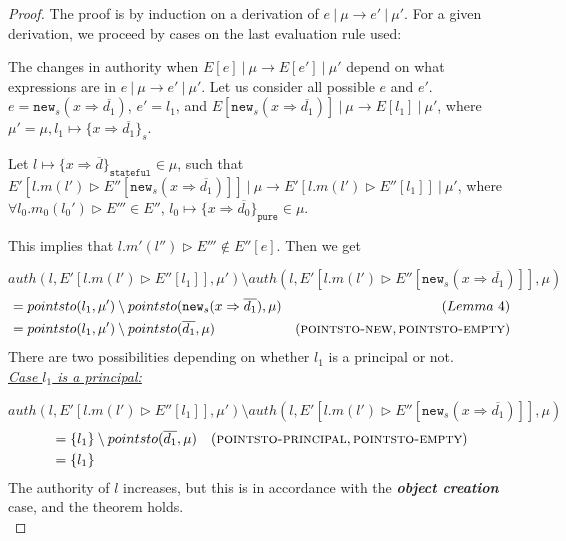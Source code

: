 \documentclass{llncs}
\newcommand{\keywadj}[1]{\mathtt{#1}}
\begin{document}
\begin{proof} The proof is by induction on a derivation of $e~|~\mu \longrightarrow e'~|~\mu'$. For a given derivation, we proceed by cases on the last evaluation rule used:\\

\sloppy 

\noindent{} The changes in authority when $E[e]~|~\mu \longrightarrow E[e']~|~\mu'$ depend on what expressions are in $e~|~\mu \longrightarrow e'~|~\mu'$. Let us consider all possible $e$ and $e'$.\\

\noindent{}
$e = \keywadj{new}_s(x \Rightarrow \overline{d_1})$, $e' = l_1$, and $E[\keywadj{new}_s(x \Rightarrow \overline{d_1})]~|~\mu \longrightarrow E[l_1]~|~\mu'$, where \mbox{$\mu' = \mu, l_1 \mapsto \{ x \Rightarrow \overline{d_1} \}_s$}.

Let $l \mapsto \{ x \Rightarrow \overline{d} \}_{\keywadj{stateful}} \in \mu$, such that $E'[l.m(l') \rhd E''[\keywadj{new}_s(x \Rightarrow \overline{d_1})]]~|~\mu \longrightarrow E'[l.m(l') \rhd E''[l_1]]~|~\mu'$, where $\forall l_0.m_0(l_0') \rhd E''' \in E''$, $l_0 \mapsto \{ x \Rightarrow \overline{d_0}\}_{\keywadj{pure}} \in \mu$.

This implies that $l.m'(l'') \rhd E''' \not\in E''[e]$. Then we get

\noindent$auth(l, E'[l.m(l') \rhd E''[l_1]], \mu') \setminus auth(l, E'[l.m(l') \rhd E''[\keywadj{new}_s(x \Rightarrow \overline{d_1})]], \mu)$
\vspace{-7pt}
\begin{align*}
&= pointsto(l_1, \mu') \setminus pointsto(\keywadj{new}_s(x \Rightarrow \overline{d_1}), \mu) & (Lemma~4)\\
&= pointsto(l_1, \mu') \setminus pointsto(\overline{d_1}, \mu) & (\textsc{pointsto-new}, \textsc{pointsto-empty})
\end{align*}
There are two possibilities depending on whether $l_1$ is a principal or not.\\

\noindent\underline{\textit{Case $l_1$ is a principal:}}

\noindent$auth(l, E'[l.m(l') \rhd E''[l_1]], \mu') \setminus auth(l, E'[l.m(l') \rhd E''[\keywadj{new}_s(x \Rightarrow \overline{d_1})]], \mu)$
\vspace{-7pt}
\begin{align*}
&= \{ l_1 \} \setminus pointsto(\overline{d_1}, \mu) & (\textsc{pointsto-principal}, \textsc{pointsto-empty})\\
&= \{ l_1 \}
\end{align*}
The authority of $l$ increases, but this is in accordance with the \textbf{\textit{object creation}} case, and the theorem holds.\\


\end{proof}
\end{document}
